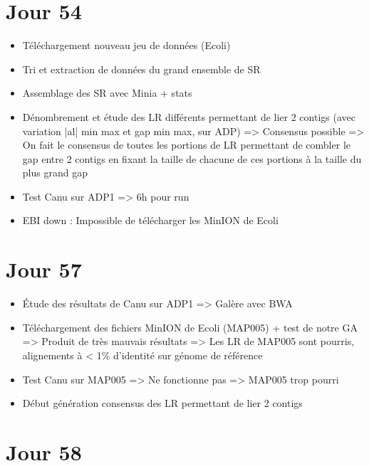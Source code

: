 \documentclass[12pt]{report}
\begin{document}
\section{Jour 54}

\begin{itemize}
	\item Téléchargement nouveau jeu de données (Ecoli)
	
	\item Tri et extraction de données du grand ensemble de SR
	
	\item Assemblage des SR avec Minia + stats
	
	\item Dénombrement et étude des LR différents permettant de lier 2 contigs (avec variation |al| min max et gap min max, sur ADP) => Consensus possible
	=> On fait le consensus de toutes les portions de LR permettant de combler le gap entre 2 contigs en fixant la taille de chacune de ces portions
	à la taille du plus grand gap
	
	\item Test Canu sur ADP1 => 6h pour run
	
	\item EBI down : Impossible de télécharger les MinION de Ecoli
\end{itemize}

\section{Jour 57}

\begin{itemize}
	\item Étude des résultats de Canu sur ADP1 => Galère avec BWA

	\item Téléchargement des fichiers MinION de Ecoli (MAP005) + test de notre GA 
	=> Produit de très mauvais résultats => Les LR de MAP005 sont pourris, alignements à < 1\% d'identité sur génome de référence

	\item Test Canu sur MAP005 => Ne fonctionne pas => MAP005 trop pourri
	
	\item Début génération consensus des LR permettant de lier 2 contigs
\end{itemize}

\section{Jour 58}
\end{document}
